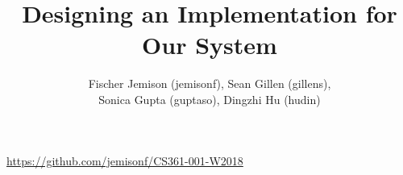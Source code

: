 \documentclass[12pt]{article}
\title{Designing an Implementation for Our System}
\author{Fischer Jemison (jemisonf), Sean Gillen (gillens), \\
Sonica Gupta (guptaso), Dingzhi Hu (hudin) }
\begin{document}
\maketitle
\centerline{\url{https://github.com/jemisonf/CS361-001-W2018}}
\tableofcontents









\end{document}

